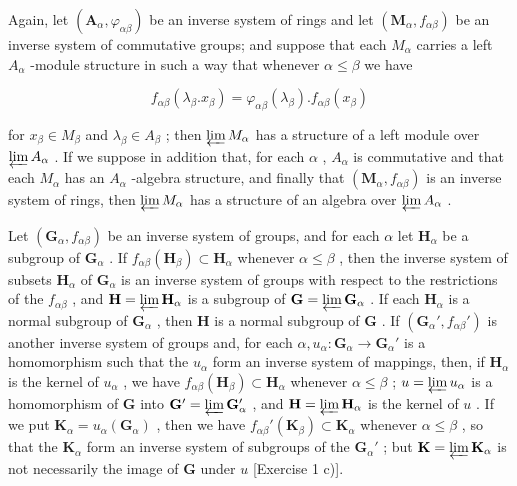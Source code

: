 Again, let \((\mathbf{A}_{\alpha}, \varphi_{\alpha\beta})\) be an inverse system of rings and let \((\mathbf{M}_{\alpha}, f_{\alpha\beta})\) be an inverse system of commutative groups; and suppose that each \(M_{\alpha}\) carries a left \(A_{\alpha}\) -module structure in such a way that whenever \(\alpha \leqslant \beta\) we have

\[
f _ {\alpha \beta} (\lambda_ {\beta}. x _ {\beta}) = \varphi_ {\alpha \beta} (\lambda_ {\beta}). f _ {\alpha \beta} (x _ {\beta})\tag{2}
\]

for \(x_{\beta} \in M_{\beta}\) and \(\lambda_{\beta} \in A_{\beta}\) ; then \(\varprojlim M_{\alpha}\) has a structure of a left module over \(\varprojlim A_{\alpha}\) . If we suppose in addition that, for each \(\alpha\) , \(A_{\alpha}\) is commutative and that each \(M_{\alpha}\) has an \(A_{\alpha}\) -algebra structure, and finally that \((\mathbf{M}_{\alpha}, f_{\alpha\beta})\) is an inverse system of rings, then \(\varprojlim M_{\alpha}\) has a structure of an algebra over \(\varprojlim A_{\alpha}\) .

Let \((\mathbf{G}_{\alpha}, f_{\alpha \beta})\) be an inverse system of groups, and for each \(\alpha\) let \(\mathbf{H}_{\alpha}\) be a subgroup of \(\mathbf{G}_{\alpha}\) . If \(f_{\alpha \beta}(\mathbf{H}_{\beta}) \subset \mathbf{H}_{\alpha}\) whenever \(\alpha \leqslant \beta\) , then the inverse system of subsets \(\mathbf{H}_{\alpha}\) of \(\mathbf{G}_{\alpha}\) is an inverse system of groups with respect to the restrictions of the \(f_{\alpha \beta}\) , and \(\mathbf{H} = \varprojlim \mathbf{H}_{\alpha}\) is a subgroup of \(\mathbf{G} = \varprojlim \mathbf{G}_{\alpha}\) . If each \(\mathbf{H}_{\alpha}\) is a normal subgroup of \(\mathbf{G}_{\alpha}\) , then \(\mathbf{H}\) is a normal subgroup of \(\mathbf{G}\) . If \((\mathbf{G}_{\alpha}', f_{\alpha \beta}')\) is another inverse system of groups and, for each \(\alpha, u_{\alpha}: \mathbf{G}_{\alpha} \to \mathbf{G}_{\alpha}'\) is a homomorphism such that the \(u_{\alpha}\) form an inverse system of mappings, then, if \(\mathbf{H}_{\alpha}\) is the kernel of \(u_{\alpha}\) , we have \(f_{\alpha \beta}(\mathbf{H}_{\beta}) \subset \mathbf{H}_{\alpha}\) whenever \(\alpha \leqslant \beta\) ; \(u = \varprojlim u_{\alpha}\) is a homomorphism of \(\mathbf{G}\) into \(\mathbf{G}' = \varprojlim \mathbf{G}_{\alpha}'\) , and \(\mathbf{H} = \varprojlim \mathbf{H}_{\alpha}\) is the kernel of \(u\) . If we put \(\mathbf{K}_{\alpha} = u_{\alpha}(\mathbf{G}_{\alpha})\) , then we have \(f_{\alpha\beta}'(\mathbf{K}_{\beta}) \subset \mathbf{K}_{\alpha}\) whenever \(\alpha \leqslant \beta\) , so that the \(\mathbf{K}_{\alpha}\) form an inverse system of subgroups of the \(\mathbf{G}_{\alpha}'\) ; but \(\mathbf{K} = \varprojlim \mathbf{K}_{\alpha}\) is not necessarily the image of \(\mathbf{G}\) under \(u\) {[}Exercise 1 c){]}.

